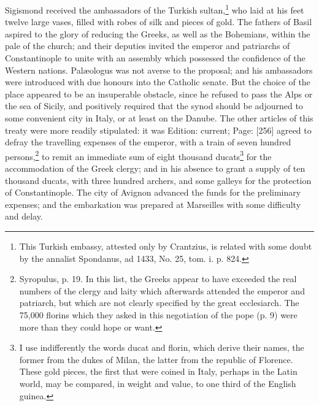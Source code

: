 Sigismond received the ambassadors of the Turkish sultan,\footnote{This Turkish embassy, attested only by Crantzius, is related with some doubt by the annalist Spondanus, ad 1433, No. 25, tom. i. p. 824.} who laid at his feet twelve large vases, filled with robes of silk and pieces of gold. The fathers of Basil aspired to the glory of reducing the Greeks, as well as the Bohemians, within the pale of the church; and their deputies invited the emperor and patriarchs of Constantinople to unite with an assembly which possessed the confidence of the Western nations. Palæologus was not averse to the proposal; and his ambassadors were introduced with due honours into the Catholic senate. But the choice of the place appeared to be an insuperable obstacle, since he refused to pass the Alps or the sea of Sicily, and positively required that the synod should be adjourned to some convenient city in Italy, or at least on the Danube. The other articles of this treaty were more readily stipulated: it was Edition: current; Page: [256] agreed to defray the travelling expenses of the emperor, with a train of seven hundred persons,\footnote{Syropulus, p. 19. In this list, the Greeks appear to have exceeded the real numbers of the clergy and laity which afterwards attended the emperor and patriarch, but which are not clearly specified by the great ecclesiarch. The 75,000 florins which they asked in this negotiation of the pope (p. 9) were more than they could hope or want.} to remit an immediate sum of eight thousand ducats\footnote{I use indifferently the words ducat and florin, which derive their names, the former from the dukes of Milan, the latter from the republic of Florence. These gold pieces, the first that were coined in Italy, perhaps in the Latin world, may be compared, in weight and value, to one third of the English guinea.} for the accommodation of the Greek clergy; and in his absence to grant a supply of ten thousand ducats, with three hundred archers, and some galleys for the protection of Constantinople. The city of Avignon advanced the funds for the preliminary expenses; and the embarkation was prepared at Marseilles with some difficulty and delay.

